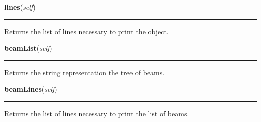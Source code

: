     \vspace{0.5ex}

\hspace{.8\funcindent}\begin{boxedminipage}{\funcwidth}

    \raggedright \textbf{lines}(\textit{self})

    \vspace{-1.5ex}

    \rule{\textwidth}{0.5\fboxrule}
\setlength{\parskip}{2ex}
    Returns the list of lines necessary to print the object.

\setlength{\parskip}{1ex}
    \end{boxedminipage}

    \label{theia:tree:beamtree:BeamTree:beamList}

    \vspace{0.5ex}

\hspace{.8\funcindent}\begin{boxedminipage}{\funcwidth}

    \raggedright \textbf{beamList}(\textit{self})

    \vspace{-1.5ex}

    \rule{\textwidth}{0.5\fboxrule}
\setlength{\parskip}{2ex}
    Returns the string representation the tree of beams.

\setlength{\parskip}{1ex}
    \end{boxedminipage}

    \label{theia:tree:beamtree:BeamTree:beamLines}

    \vspace{0.5ex}

\hspace{.8\funcindent}\begin{boxedminipage}{\funcwidth}

    \raggedright \textbf{beamLines}(\textit{self})

    \vspace{-1.5ex}

    \rule{\textwidth}{0.5\fboxrule}
\setlength{\parskip}{2ex}
    Returns the list of lines necessary to print the list of beams.

\setlength{\parskip}{1ex}
    \end{boxedminipage}

